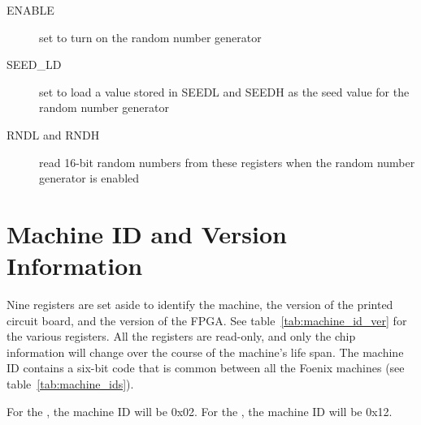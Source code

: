 \begin{description}
    \item[ENABLE] set to turn on the random number generator

    \item[SEED\_LD] set to load a value stored in SEEDL and SEEDH as the seed value for the random number generator

    \item[RNDL and RNDH] read 16-bit random numbers from these registers when the random number generator is enabled
\end{description}

\section*{Machine ID and Version Information}

Nine registers are set aside to identify the machine, the version of the printed circuit board, and the version of the FPGA. See table~\ref{tab:machine_id_ver} for the various registers. All the registers are read-only, and only the chip information will change over the course of the machine's life span. The machine ID contains a six-bit code that is common between all the Foenix machines (see table~\ref{tab:machine_ids}).

For the \jr, the machine ID will be 0x02. For the \fk, the machine ID will be 0x12.

